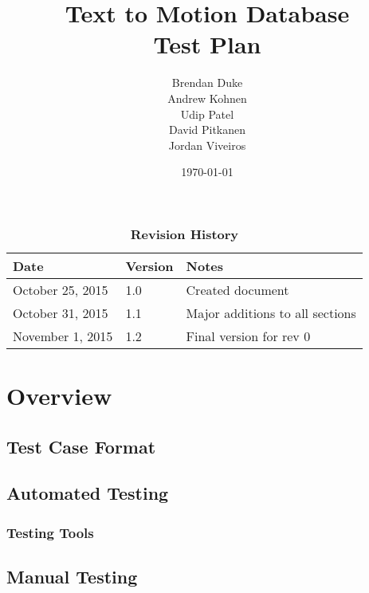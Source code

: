 \documentclass{scrreprt}
\begin{document}
\title{\bf Text to Motion Database\\[\baselineskip]\Large Test Plan}
\author{Brendan Duke\\Andrew Kohnen\\Udip Patel\\David Pitkanen\\Jordan Viveiros}
\date{\today}
	
\maketitle

\tableofcontents
\listoftables
\listoffigures


\begin{table}[bp]
\caption*{\bf Revision History}
\begin{tabularx}{\textwidth}{p{3.5cm}p{2cm}X}
\toprule {\bf Date} & {\bf Version} & {\bf Notes}\\
\midrule
October 25, 2015 & 1.0 & Created document\\
October 31, 2015 & 1.1 & Major additions to all sections\\
November 1, 2015 & 1.2 & Final version for rev 0\\
\bottomrule
\end{tabularx}
\end{table}

\newpage


\chapter{Overview}

\section{Test Case Format}

\section{Automated Testing}

\subsection{Testing Tools}

\section{Manual Testing}
\end{document}
